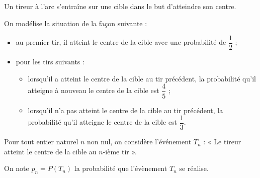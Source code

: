 Un tireur à l'arc s'entraîne sur une cible dans le but d'atteindre son centre.

On modélise la situation de la façon suivante :

\begin{itemize}
\item au premier tir, il atteint le centre de la cible avec une probabilité de $\dfrac{1}{2}$ ;
\item pour les tirs suivants :
\begin{itemize}
\item lorsqu'il a atteint le centre de la cible au tir précédent, la probabilité qu'il atteigne à nouveau le centre de la cible est $\dfrac{4}{5}$ ;
\item lorsqu'il n'a pas atteint le centre de la cible au tir précédent, la probabilité qu'il atteigne le centre de la cible est $\dfrac{1}{3}$.
\end{itemize}
\end{itemize}

Pour tout entier naturel $n$ non nul, on considère l'événement $T_n$ : « Le tireur atteint le centre de la cible au $n$-ième tir ».

On note $p_n = P\left(T_n\right)$ la probabilité que l'évènement $T_n$ se réalise.

